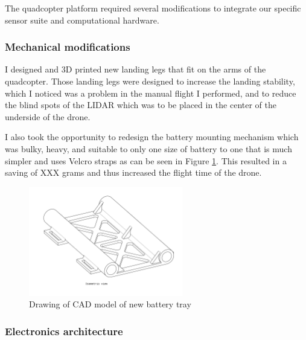 \documentclass[11pt]{article}
\begin{document}
            The quadcopter platform required several modifications to integrate our specific sensor suite and computational hardware.

            \subsubsection{Mechanical modifications}

                I designed and 3D printed new landing legs that fit on the arms of the quadcopter. Those landing legs were designed to increase the landing stability, which I noticed was a problem in the manual flight I performed, and to reduce the blind spots of the LIDAR which was to be placed in the center of the underside of the drone.

                I also took the opportunity to redesign the battery mounting mechanism which was bulky, heavy, and suitable to only one size of battery to one that is much simpler and uses Velcro straps as can be seen in Figure \ref{fig:landing_legs}. This resulted in a saving of \color{red} XXX grams \color{black} and thus increased the flight time of the drone. 
                

                \begin{figure}[H]
                    \centering
                    \includegraphics[width=0.6\textwidth]{Images/BatteryTrayDrawing.pdf}
                    \caption{Drawing of CAD model of new battery tray}
                    \label{fig:landing_legs}
                \end{figure}    
            \subsubsection{Electronics architecture}

\end{document}
